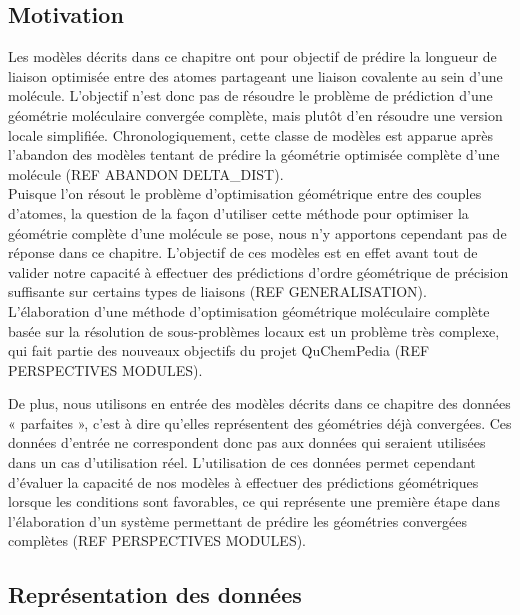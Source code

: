 \subsection{Motivation}

Les modèles décrits dans ce chapitre ont pour objectif de prédire la longueur de liaison optimisée entre des atomes partageant une liaison covalente au sein d'une molécule. L'objectif n'est donc pas de résoudre le problème de prédiction d'une géométrie moléculaire convergée complète, mais plutôt d'en résoudre une version locale simplifiée. Chronologiquement, cette classe de modèles est apparue après l'abandon des modèles tentant de prédire la géométrie optimisée complète d'une molécule (REF ABANDON DELTA\_DIST).\\
Puisque l'on résout le problème d'optimisation géométrique entre des couples d'atomes, la question de la façon d'utiliser cette méthode pour optimiser la géométrie complète d'une molécule se pose, nous n'y apportons cependant pas de réponse dans ce chapitre. L'objectif de ces modèles est en effet avant tout de valider notre capacité à effectuer des prédictions d'ordre géométrique de précision suffisante sur certains types de liaisons (REF GENERALISATION). L'élaboration d'une méthode d'optimisation géométrique moléculaire complète basée sur la résolution de sous-problèmes locaux est un problème très complexe, qui fait partie des nouveaux objectifs du projet QuChemPedia (REF PERSPECTIVES MODULES).\\
\par De plus, nous utilisons en entrée des modèles décrits dans ce chapitre des données « parfaites », c'est à dire qu'elles représentent des géométries déjà convergées. Ces données d'entrée ne correspondent donc pas aux données qui seraient utilisées dans un cas d'utilisation réel. L'utilisation de ces données permet cependant d'évaluer la capacité de nos modèles à effectuer des prédictions géométriques lorsque les conditions sont favorables, ce qui représente une première étape dans l'élaboration d'un système permettant de prédire les géométries convergées complètes (REF PERSPECTIVES MODULES).

\subsection{Représentation des données}


